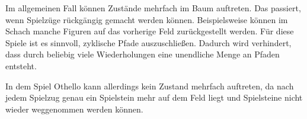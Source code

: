 Im allgemeinen Fall können Zustände mehrfach im Baum auftreten. Das passiert, wenn Spielzüge rückgängig gemacht werden
können. Beispielsweise können im Schach manche Figuren auf das vorherige Feld zurückgestellt werden. Für diese Spiele
ist es sinnvoll, zyklische Pfade auszuschließen. Dadurch wird verhindert, dass durch beliebig viele Wiederholungen eine
unendliche Menge an Pfaden entsteht.
\cite[S.~75]{ai2010russel}

In dem Spiel Othello kann allerdings kein Zustand mehrfach auftreten, da nach jedem Spielzug genau ein Spielstein mehr
auf dem Feld liegt und Spielsteine nicht wieder weggenommen werden können.
